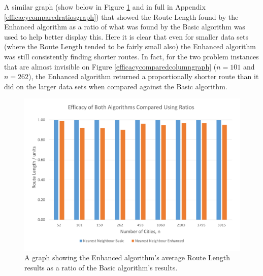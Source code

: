 \documentclass[conference,backref=page]{acmsiggraph}
\begin{document}
 A similar graph (show below in Figure \ref{efficacycomparedratioscolumngraph} and in full in Appendix \ref{efficacycomparedratiosgraph}) that showed the Route Length found by the Enhanced algorithm as a ratio of what was found by the Basic algorithm was used to help better display this. Here it is clear that even for smaller data sets (where the Route Length tended to be fairly small also) the Enhanced algorithm was still consistently finding shorter routes. In fact, for the two problem instances that are almost invisible on Figure \ref{efficacycomparedcolumngraph} ($n = 101$ and $n = 262$), the Enhanced algorithm returned a proportionally shorter route than it did on the larger data sets when compared against the Basic algorithm.

\begin{figure}[H]
	\includegraphics[width=\columnwidth]{images/efficacy_compared_ratios_column.pdf}
	\caption{A graph showing the Enhanced algorithm's average Route Length results as a ratio of the Basic algorithm's results.}
	\label{efficacycomparedratioscolumngraph}
\end{figure}
\end{document}
